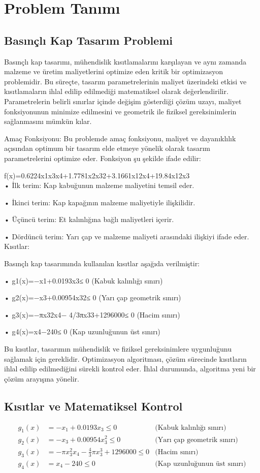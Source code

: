 \documentclass[12pt,a4paper]{article}
\begin{document}
\section{Problem Tanımı}
\subsection{Basınçlı Kap Tasarım Problemi}
Basınçlı kap tasarımı, mühendislik kısıtlamalarını karşılayan ve aynı zamanda malzeme ve üretim maliyetlerini optimize eden kritik bir optimizasyon problemidir. Bu süreçte, tasarım parametrelerinin maliyet üzerindeki etkisi ve kısıtlamaların ihlal edilip edilmediği matematiksel olarak değerlendirilir. Parametrelerin belirli sınırlar içinde değişim gösterdiği çözüm uzayı, maliyet fonksiyonunun minimize edilmesini ve geometrik ile fiziksel gereksinimlerin sağlanmasını mümkün kılar.

Amaç Fonksiyonu:
Bu problemde amaç fonksiyonu, maliyet ve dayanıklılık açısından optimum bir tasarım elde etmeye yönelik olarak tasarım parametrelerini optimize eder. Fonksiyon şu şekilde ifade edilir:

f(x)=0.6224x1x3x4+1.7781x2x32+3.1661x12x4+19.84x12x3
\\

•	İlk terim: Kap kabuğunun malzeme maliyetini temsil eder.

•	İkinci terim: Kap kapağının malzeme maliyetiyle ilişkilidir.

•	Üçüncü terim: Et kalınlığına bağlı maliyetleri içerir.

•	Dördüncü terim: Yarı çap ve malzeme maliyeti arasındaki ilişkiyi ifade eder.
\\
Kısıtlar:

Basınçlı kap tasarımında kullanılan kısıtlar aşağıda verilmiştir:

•	g1(x)=−x1+0.0193x3≤ 0 (Kabuk kalınlığı sınırı)

•	g2(x)=−x3+0.00954x32≤ 0 (Yarı çap geometrik sınırı)

•	g3(x)=−πx32x4− 4/3πx33+1296000≤ 0 (Hacim sınırı)

•	g4(x)=x4−240≤ 0 (Kap uzunluğunun üst sınırı)


Bu kısıtlar, tasarımın mühendislik ve fiziksel gereksinimlere uygunluğunu sağlamak için gereklidir. Optimizasyon algoritması, çözüm sürecinde kısıtların ihlal edilip edilmediğini sürekli kontrol eder. İhlal durumunda, algoritma yeni bir çözüm arayışına yönelir.

\subsection{Kısıtlar ve Matematiksel Kontrol}
\begin{align*}
g_1(x) &= -x_1 + 0.0193x_3 \leq 0 & \text{(Kabuk kalınlığı sınırı)}\\
g_2(x) &= -x_3 + 0.00954x_3^2 \leq 0 & \text{(Yarı çap geometrik sınırı)}\\
g_3(x) &= -\pi x_3^2x_4 - \frac{4}{3}\pi x_3^3 + 1296000 \leq 0 & \text{(Hacim sınırı)}\\
g_4(x) &= x_4 - 240 \leq 0 & \text{(Kap uzunluğunun üst sınırı)}
\end{align*}
\end{document}
